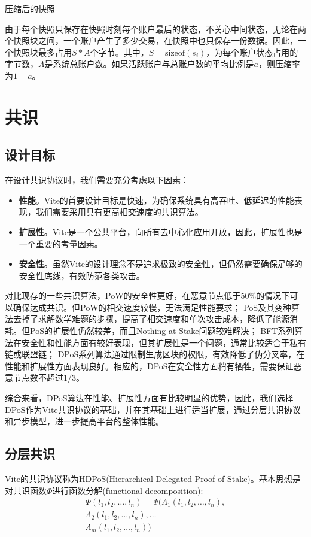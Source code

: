 \documentclass[UTF8,nofonts]{ctexart}
\makeatletter
\newenvironment{figurehere}
 {\def\@captype{figure}}
 {}
\makeatother
\begin{document}
\begin{multicols}{2}
\begin{center}
\begin{figurehere}
\begin{tikzpicture}
\end{tikzpicture}

\caption{压缩后的快照}
\label{fig:compact-snapshot}
\end{figurehere}
\end{center}

由于每个快照只保存在快照时刻每个账户最后的状态，不关心中间状态，无论在两个快照块之间，一个账户产生了多少交易，在快照中也只保存一份数据。因此，一个快照块最多占用$S * A$个字节。其中，$S = \text{sizeof}(s_{i})$，为每个账户状态占用的字节数，$A$是系统总账户数。如果活跃账户与总账户数的平均比例是$a$，则压缩率为$1-a$。

\section{共识}
\subsection{设计目标}
在设计共识协议时，我们需要充分考虑以下因素：
\begin{itemize}
	\item \textbf{性能}。Vite的首要设计目标是快速，为确保系统具有高吞吐、低延迟的性能表现，我们需要采用具有更高相交速度的共识算法。
	\item \textbf{扩展性}。Vite是一个公共平台，向所有去中心化应用开放，因此，扩展性也是一个重要的考量因素。
	\item \textbf{安全性}。虽然Vite的设计理念不是追求极致的安全性，但仍然需要确保足够的安全性底线，有效防范各类攻击。
\end{itemize}

对比现存的一些共识算法，PoW的安全性更好，在恶意节点低于50\%的情况下可以确保达成共识。但PoW的相交速度较慢，无法满足性能要求；
PoS及其变种算法去掉了求解数学难题的步骤，提高了相交速度和单次攻击成本，降低了能源消耗。但PoS的扩展性仍然较差，而且Nothing at Stake问题\cite{problems}较难解决；
BFT系列算法在安全性和性能方面有较好表现，但其扩展性是一个问题，通常比较适合于私有链或联盟链；
DPoS\cite{dpos}系列算法通过限制生成区块的权限，有效降低了伪分叉率，在性能和扩展性方面表现良好。相应的，DPoS在安全性方面稍有牺牲，需要保证恶意节点数不超过1/3\cite{dpos2}。

综合来看，DPoS算法在性能、扩展性方面有比较明显的优势，因此，我们选择DPoS作为Vite共识协议的基础，并在其基础上进行适当扩展，通过分层共识协议和异步模型，进一步提高平台的整体性能。

\subsection{分层共识}
Vite的共识协议称为HDPoS(Hierarchical Delegated Proof of Stake)。基本思想是对共识函数$\Phi$进行函数分解(functional decomposition):
\begin{equation}
\begin{split}
\Phi(l_1,l_2,\dots,l_n) = \Psi(\Lambda_1(l_1,l_2,\dots,l_n), \\
\Lambda_2(l_1,l_2,\dots,l_n),\dots \\
\Lambda_m(l_1,l_2,\dots,l_n))
\end{split}
\end{equation}


\end{multicols}
\end{document}
